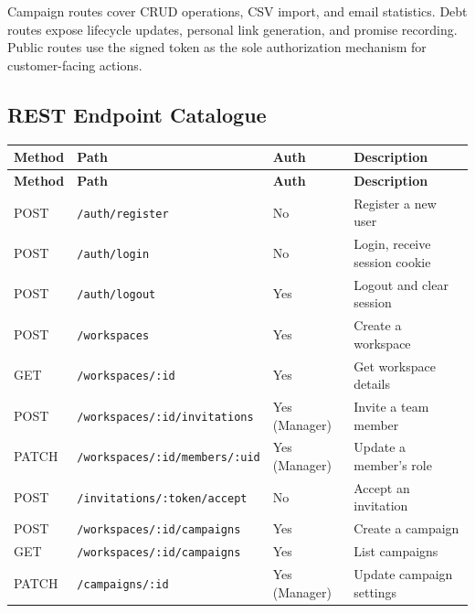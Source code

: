 \documentclass[12pt,a4paper]{report}
\begin{document}
Campaign routes cover CRUD operations, CSV import, and email statistics.
Debt routes expose lifecycle updates, personal link generation, and promise recording.
Public routes use the signed token as the sole authorization mechanism for
customer-facing actions.

\subsection{REST Endpoint Catalogue}

{\footnotesize
\setlength{\tabcolsep}{4pt}%
\begin{longtable}{|p{1.2cm}|p{4.95cm}|p{2.25cm}|p{5.05cm}|}
  \hline
  \rowcolor{accentblue!10}
  \textbf{Method} & \textbf{Path} & \textbf{Auth} & \textbf{Description} \\
  \hline
  \endfirsthead
  \hline
  \rowcolor{accentblue!10}
  \textbf{Method} & \textbf{Path} & \textbf{Auth} & \textbf{Description} \\
  \hline
  \endhead
  POST  & \texttt{/auth/register}                     & No            &
    Register a new user \\
  \hline
  POST  & \texttt{/auth/login}                        & No            &
    Login, receive session cookie \\
  \hline
  POST  & \texttt{/auth/logout}                       & Yes           &
    Logout and clear session \\
  \hline
  POST  & \texttt{/workspaces}                        & Yes           &
    Create a workspace \\
  \hline
  GET   & \texttt{/workspaces/:id}                    & Yes           &
    Get workspace details \\
  \hline
  POST  & \texttt{/workspaces/:id/invitations}        & Yes (Manager) &
    Invite a team member \\
  \hline
  PATCH & \texttt{/workspaces/:id/members/:uid}       & Yes (Manager) &
    Update a member's role \\
  \hline
  POST  & \texttt{/invitations/:token/accept}         & No            &
    Accept an invitation \\
  \hline
  POST  & \texttt{/workspaces/:id/campaigns}          & Yes           &
    Create a campaign \\
  \hline
  GET   & \texttt{/workspaces/:id/campaigns}          & Yes           &
    List campaigns \\
  \hline
  PATCH & \texttt{/campaigns/:id}                     & Yes (Manager) &
    Update campaign settings \\

\end{longtable}}
\end{document}
